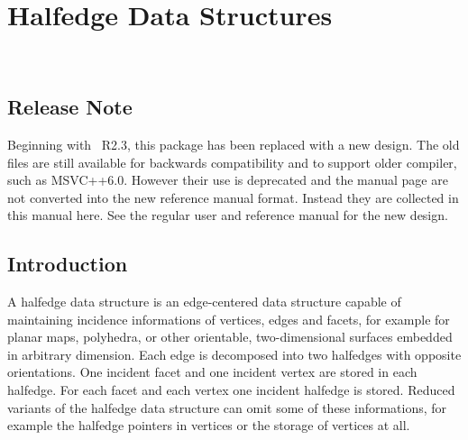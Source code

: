 
\ccParDims

\chapter{Halfedge Data Structures}
\label{chapterHds}
\\

\section{Release Note}

Beginning with \cgal\ R2.3, this package has been replaced with a new
design.  The old files are still available for backwards compatibility
and to support older compiler, such as MSVC++6.0. However their use is
deprecated and the manual page are not converted into the new
reference manual format. Instead they are collected in this manual
here. See the regular user and reference manual for the new design.

\section{Introduction}

A halfedge data structure is an edge-centered data structure capable
of maintaining incidence informations of vertices, edges and facets,
for example for planar maps, polyhedra, or other orientable,
two-dimensional surfaces embedded in arbitrary dimension. Each edge is
decomposed into two halfedges with opposite orientations. One incident
facet and one incident vertex are stored in each halfedge.  For each
facet and each vertex one incident halfedge is stored.  Reduced
variants of the halfedge data structure can omit some of these
informations, for example the halfedge pointers in vertices or the
storage of vertices at all.

